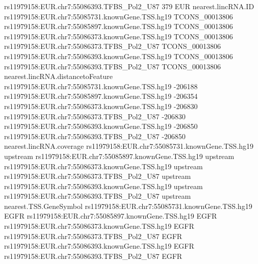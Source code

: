 \documentclass[a4paper]{article}
\begin{document}
\begin{Schunk}
\begin{Soutput}
rs11979158:EUR.chr7:55086393.TFBS_Pol2_U87                   379        EUR
                                                nearest.lincRNA.ID
rs11979158:EUR.chr7:55085731.knownGene.TSS.hg19     TCONS_00013806
rs11979158:EUR.chr7:55085897.knownGene.TSS.hg19     TCONS_00013806
rs11979158:EUR.chr7:55086373.knownGene.TSS.hg19     TCONS_00013806
rs11979158:EUR.chr7:55086373.TFBS_Pol2_U87          TCONS_00013806
rs11979158:EUR.chr7:55086393.knownGene.TSS.hg19     TCONS_00013806
rs11979158:EUR.chr7:55086393.TFBS_Pol2_U87          TCONS_00013806
                                                nearest.lincRNA.distancetoFeature
rs11979158:EUR.chr7:55085731.knownGene.TSS.hg19                           -206188
rs11979158:EUR.chr7:55085897.knownGene.TSS.hg19                           -206354
rs11979158:EUR.chr7:55086373.knownGene.TSS.hg19                           -206830
rs11979158:EUR.chr7:55086373.TFBS_Pol2_U87                                -206830
rs11979158:EUR.chr7:55086393.knownGene.TSS.hg19                           -206850
rs11979158:EUR.chr7:55086393.TFBS_Pol2_U87                                -206850
                                                nearest.lincRNA.coverage
rs11979158:EUR.chr7:55085731.knownGene.TSS.hg19                 upstream
rs11979158:EUR.chr7:55085897.knownGene.TSS.hg19                 upstream
rs11979158:EUR.chr7:55086373.knownGene.TSS.hg19                 upstream
rs11979158:EUR.chr7:55086373.TFBS_Pol2_U87                      upstream
rs11979158:EUR.chr7:55086393.knownGene.TSS.hg19                 upstream
rs11979158:EUR.chr7:55086393.TFBS_Pol2_U87                      upstream
                                                nearest.TSS.GeneSymbol
rs11979158:EUR.chr7:55085731.knownGene.TSS.hg19                   EGFR
rs11979158:EUR.chr7:55085897.knownGene.TSS.hg19                   EGFR
rs11979158:EUR.chr7:55086373.knownGene.TSS.hg19                   EGFR
rs11979158:EUR.chr7:55086373.TFBS_Pol2_U87                        EGFR
rs11979158:EUR.chr7:55086393.knownGene.TSS.hg19                   EGFR
rs11979158:EUR.chr7:55086393.TFBS_Pol2_U87                        EGFR


\end{Soutput}
\end{Schunk}
\end{document}
